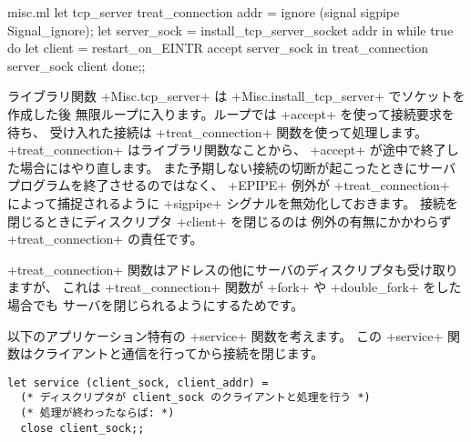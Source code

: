 \begin{listingcodefile}{misc.ml}
let tcp_server treat_connection addr =
  ignore (signal sigpipe Signal_ignore);
  let server_sock = install_tcp_server_socket addr in
  while true do
      let client = restart_on_EINTR accept server_sock in
      treat_connection server_sock client
  done;;
\end{listingcodefile}
ライブラリ関数 \ml+Misc.tcp_server+ は \ml+Misc.install_tcp_server+ でソケットを作成した後
無限ループに入ります。ループでは \ml+accept+ を使って接続要求を待ち、
受け入れた接続は \ml+treat_connection+ 関数を使って処理します。
\ml+treat_connection+ はライブラリ関数なことから、
\ml+accept+ が途中で終了した場合にはやり直します。
また予期しない接続の切断が起こったときにサーバプログラムを終了させるのではなく、
\ml+EPIPE+ 例外が \ml+treat_connection+ によって捕捉されるように
\ml+sigpipe+ シグナルを無効化しておきます。
接続を閉じるときにディスクリプタ \ml+client+ を閉じるのは
例外の有無にかかわらず \ml+treat_connection+ の責任です。

\ml+treat_connection+ 関数はアドレスの他にサーバのディスクリプタも受け取りますが、
これは \ml+treat_connection+ 関数が \ml+fork+ や \ml+double_fork+ をした場合でも
サーバを閉じられるようにするためです。

以下のアプリケーション特有の \ml+service+ 関数を考えます。
この \ml+service+ 関数はクライアントと通信を行ってから接続を閉じます。
%
\begin{lstlisting}
let service (client_sock, client_addr) =
  (* ディスクリプタが client_sock のクライアントと処理を行う *)
  (* 処理が終わったならば: *)
  close client_sock;;
\end{lstlisting}
%

